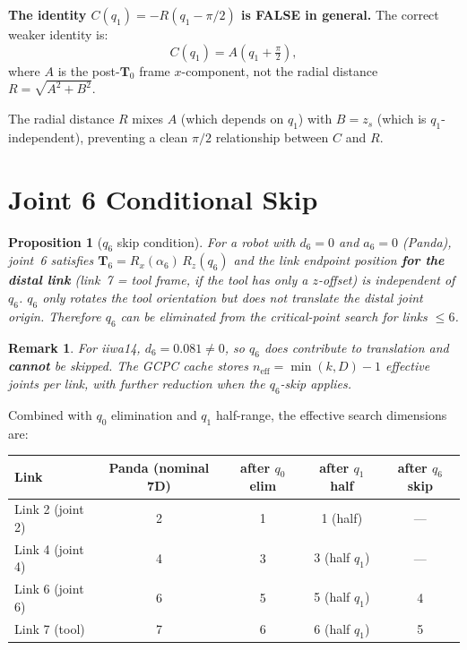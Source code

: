 \documentclass[11pt,a4paper]{article}
\newtheorem{proposition}[theorem]{Proposition}
\newtheorem{remark}{Remark}[section]
\newcommand{\bT}{\mathbf{T}}
\begin{document}
\begin{tcolorbox}[colback=red!5, colframe=red!50!black, title=Summary]
\textbf{The identity $C(q_1) = -R(q_1 - \pi/2)$ is FALSE in general.}
The correct weaker identity is:
\[
  C(q_1) = A(q_1 + \tfrac\pi2),
\]
where $A$ is the post-$\bT_0$ frame $x$-component, not the radial
distance $R = \sqrt{A^2+B^2}$.

The radial distance $R$ mixes $A$ (which depends on $q_1$) with
$B = z_s$ (which is $q_1$-independent), preventing a clean $\pi/2$
relationship between $C$ and $R$.
\end{tcolorbox}


\section{Joint 6 Conditional Skip}\label{sec:q6}

\begin{proposition}[$q_6$ skip condition]\label{prop:q6_skip}
For a robot with $d_6 = 0$ and $a_6 = 0$ (Panda), joint~6 satisfies
$\bT_6 = R_x(\alpha_6)\,R_z(q_6)$
and the link endpoint position \textbf{for the distal link}
(link~7 = tool frame, if the tool has only a $z$-offset) is independent
of $q_6$. $q_6$ only rotates the tool orientation but does not translate
the distal joint origin. Therefore $q_6$ can be eliminated from the
critical-point search for links $\le 6$.
\end{proposition}

\begin{remark}
For iiwa14, $d_6 = 0.081 \ne 0$, so $q_6$ does contribute to
translation and \textbf{cannot} be skipped. The GCPC cache stores
$n_\text{eff} = \min(k, D) - 1$ effective joints per link, with
further reduction when the $q_6$-skip applies.
\end{remark}

\medskip
Combined with $q_0$ elimination and $q_1$ half-range, the effective
search dimensions are:

\begin{center}
\begin{tabular}{l|cccc}
\toprule
Link & Panda (nominal 7D) & after $q_0$ elim & after $q_1$ half & after $q_6$ skip \\
\midrule
Link 2 (joint 2) & 2 & 1 & 1 (half) & --- \\
Link 4 (joint 4) & 4 & 3 & 3 (half $q_1$) & --- \\
Link 6 (joint 6) & 6 & 5 & 5 (half $q_1$) & 4 \\
Link 7 (tool)     & 7 & 6 & 6 (half $q_1$) & 5 \\
\bottomrule
\end{tabular}
\end{center}
\end{document}
